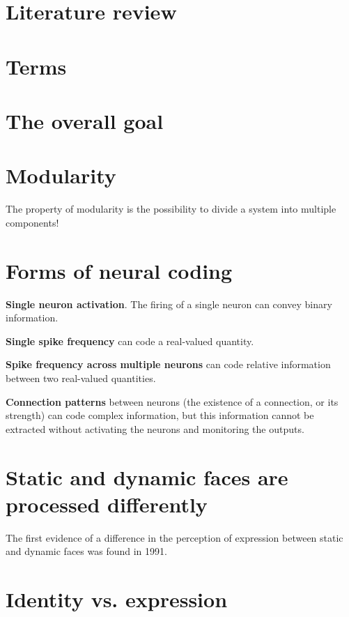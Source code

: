 \section{Literature review}

\section{Terms}

\section{The overall goal}


\section{Modularity}

The property of modularity is the possibility to divide a system into multiple components!

\section{Forms of neural coding}

\begin{itemise}
\item \textbf{Single neuron activation}. The firing of a single neuron can convey binary information.
\item \textbf{Single spike frequency} can code a real-valued quantity.
\item \textbf{Spike frequency across multiple neurons} can code relative information between two real-valued quantities.
\item \textbf{Connection patterns} between neurons (the existence of a connection, or its strength) can code complex information, but this information cannot be extracted without activating the neurons and monitoring the outputs.
\end{itemise}

\section{Static and dynamic faces are processed differently}

The first evidence of a difference in the perception of expression between static and dynamic faces was found in 1991\cite{humphreys1993expression}.


\section{Identity vs. expression}

